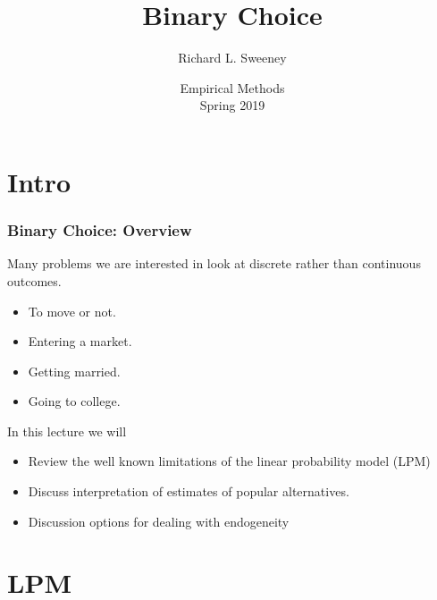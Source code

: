 

\title{Binary Choice}
\author{Richard L. Sweeney}
\date{Empirical Methods \\ Spring 2019}




\begin{frame}
    \titlepage
\end{frame}

\begin{frame}
    \tableofcontents  
\end{frame}

\section{Intro}

\begin{frame}
\frametitle{Binary Choice: Overview}
Many problems we are interested in look at discrete rather than continuous outcomes.
\begin{itemize}
       \item To move or not. 
       \item Entering a market.
       \item Getting married. 
       \item Going to college.
\end{itemize}
In this lecture we will 

\begin{itemize}
\item Review the well known limitations of the linear probability model (LPM)
\item Discuss interpretation of estimates of popular alternatives. 
\item Discussion options for dealing with endogeneity
\end{itemize}
\end{frame}

\section{LPM}

